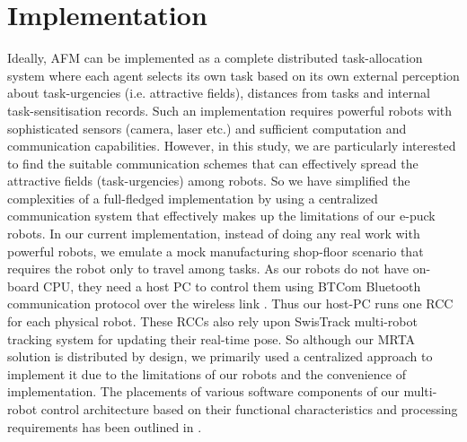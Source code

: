 \documentclass[journal]{IEEEtran}
\begin{document}
\section{Implementation}
\label{sec:imp}
Ideally, AFM can be implemented as a complete distributed task-allocation system where each agent selects its own task based on its own external perception about task-urgencies (i.e. attractive fields),  distances from tasks and internal task-sensitisation records. Such an implementation requires powerful robots with sophisticated sensors (camera, laser etc.) and sufficient computation and communication  capabilities. However, in this study, we are particularly interested to find the suitable communication schemes that can effectively spread the attractive fields (task-urgencies) among robots. So we have simplified the complexities of a full-fledged implementation by using a centralized communication system  that effectively makes up the limitations of our e-puck robots.  
In our current implementation, instead of doing any real work with powerful robots, we emulate a mock manufacturing shop-floor scenario that requires the robot only to travel among tasks. As our robots do not have on-board CPU, they need a host PC to  control them using BTCom Bluetooth communication protocol over the wireless link \cite{Mondada+2009}. Thus our host-PC runs one RCC for each physical robot. These RCCs also rely upon SwisTrack multi-robot tracking system for updating their real-time pose. So although our MRTA solution is distributed by design, we primarily used a centralized approach to implement it due to the limitations of our robots and the convenience of implementation. The placements of various software components of our multi-robot control architecture based on their functional characteristics and processing requirements has been outlined in \cite{Sarker2010control}.
\end{document}
